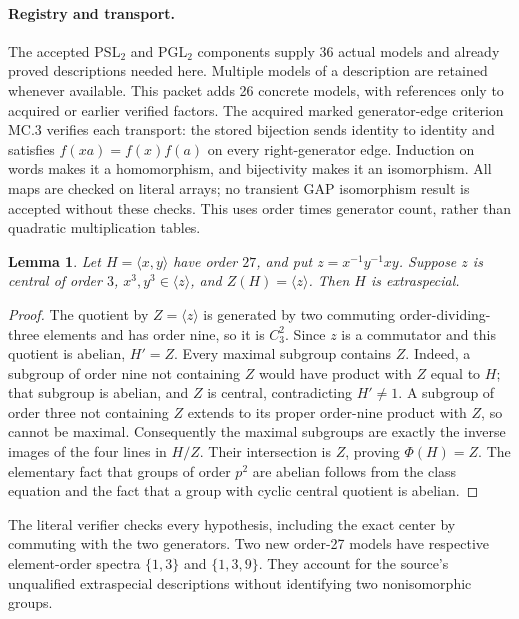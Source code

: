 \documentclass[11pt]{article}
\newtheorem{lemma}{Lemma}
\begin{document}
\newpage
\paragraph{Registry and transport.}
The accepted PSL$_2$ and PGL$_2$ components supply 36 actual models and
already proved descriptions needed here. Multiple models of a description
are retained whenever available. This packet adds 26 concrete models,
with references only to acquired or earlier verified factors. The acquired
marked generator-edge criterion MC.3 verifies each transport: the stored
bijection sends identity to identity and satisfies
$f(xa)=f(x)f(a)$ on every right-generator edge. Induction on words makes
it a homomorphism, and bijectivity makes it an isomorphism. All maps are
checked on literal arrays; no transient GAP isomorphism result is accepted
without these checks. This uses order times generator count, rather than
quadratic multiplication tables.

\begin{lemma}
Let $H=\langle x,y\rangle$ have order $27$, and put
$z=x^{-1}y^{-1}xy$. Suppose $z$ is central of order $3$, $x^3,y^3\in
\langle z\rangle$, and $Z(H)=\langle z\rangle$. Then $H$ is extraspecial.
\end{lemma}
\begin{proof}
The quotient by $Z=\langle z\rangle$ is generated by two commuting
order-dividing-three elements and has order nine, so it is $C_3^2$.
Since $z$ is a commutator and this quotient is abelian, $H'=Z$.
Every maximal subgroup contains $Z$. Indeed, a subgroup of order nine
not containing $Z$ would have product with $Z$ equal to $H$; that subgroup
is abelian, and $Z$ is central, contradicting $H'\ne1$. A subgroup of
order three not containing $Z$ extends to its proper order-nine product
with $Z$, so cannot be maximal. Consequently the maximal subgroups are
exactly the inverse images of the four lines in $H/Z$. Their intersection
is $Z$, proving $\Phi(H)=Z$. The elementary fact that groups of order
$p^2$ are abelian follows from the class equation and the fact that a group
with cyclic central quotient is abelian.
\end{proof}
The literal verifier checks every hypothesis, including the exact center
by commuting with the two generators. Two new order-27 models have
respective element-order spectra $\{1,3\}$ and $\{1,3,9\}$.
They account for the source's unqualified extraspecial descriptions without
identifying two nonisomorphic groups.
\end{document}
